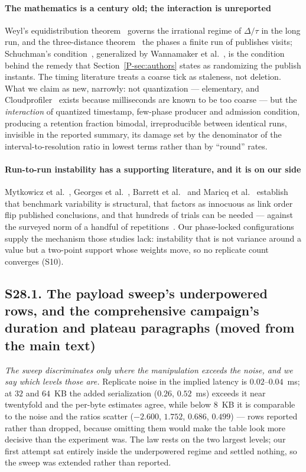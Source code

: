 \documentclass[10pt,journal,onecolumn]{IEEEtran}
\newcommand{\mainAuthors}{\ref{P-sec:authors}}        %
\begin{document}
\paragraph{The mathematics is a century old; the interaction is unreported}
Weyl's equidistribution theorem~\cite{weyl1916gleichverteilung} governs the irrational regime of
$\Delta/\tau$ in the long run, and the three-distance theorem~\cite{sos1958distribution} the
phases a finite run of publishes visits; Schuchman's condition~\cite{schuchman1964dither}, generalized by Wannamaker
et al.~\cite{wannamaker2000dither}, is the condition behind the remedy that Section~\mainAuthors{} states as randomizing the publish
instants. The timing literature treats a coarse tick as staleness, not deletion. What we claim
as new, narrowly: not quantization --- elementary, and
Cloudprofiler~\cite{yang2022cloudprofiler} exists because milliseconds are known to be
too coarse --- but the \emph{interaction} of quantized timestamp, few-phase producer and
admission condition, producing a retention fraction bimodal, irreproducible between identical
runs, invisible in the reported summary, its damage set by the denominator of the
interval-to-resolution ratio in lowest terms rather than by ``round'' rates.

\paragraph{Run-to-run instability has a supporting literature, and it is on our side}
Mytkowicz et al.~\cite{mytkowicz2009wrong}, Georges et al.~\cite{georges2007rigorous},
Barrett et al.~\cite{barrett2017warmup} and Maricq et al.~\cite{maricq2018taming}
establish that benchmark variability is structural, that factors as innocuous as link
order flip published conclusions, and that hundreds of trials can be needed --- against
the surveyed norm of a handful of
repetitions~\cite{hoefler2015benchmarking, vanderkouwe2019sok}. Our phase-locked
configurations supply the mechanism those studies lack: instability that is not variance
around a value but a two-point support whose weights move, so no replicate count converges (S10).


\subsection{S28.1. The payload sweep's underpowered rows, and the comprehensive campaign's duration and plateau paragraphs (moved from the main text)}

\emph{The sweep discriminates only where the manipulation exceeds the noise, and we say
which levels those are.} Replicate noise in the implied latency is $0.02$--$0.04$~ms; at
$32$ and $64$~KB the added serialization ($0.26$, $0.52$~ms) exceeds it near twentyfold and
the per-byte estimates agree, while below $8$~KB it is comparable to the noise and the
ratios scatter ($-2.600$, $1.752$, $0.686$, $0.499$) --- rows reported rather than
dropped, because omitting them would make the table look more decisive than the experiment
was. The law rests on the two largest levels; our first attempt sat entirely inside the
underpowered regime and settled nothing, so the sweep was extended rather than reported.
\end{document}
